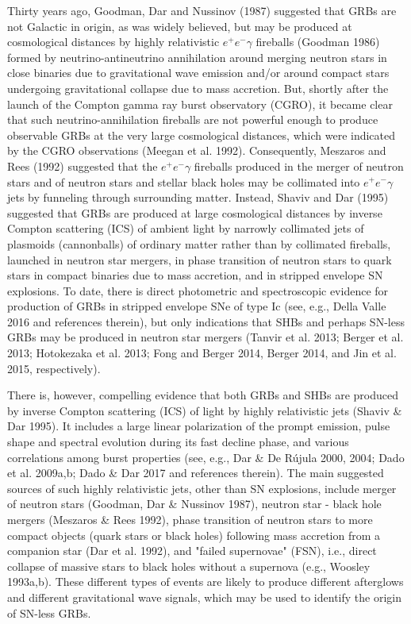 \documentclass[twocolumn]{aastex61}
\begin{document}
Thirty years ago, Goodman, Dar and Nussinov (1987) suggested that GRBs 
are not Galactic in origin, as was widely believed, but may be 
produced at cosmological distances by highly relativistic 
$e^+e^-\gamma$ fireballs (Goodman 1986) formed by 
neutrino-antineutrino annihilation around merging neutron stars in 
close binaries due to gravitational wave emission and/or around 
compact stars undergoing gravitational collapse due to mass accretion. 
But, shortly after the launch of the Compton gamma ray burst 
observatory (CGRO), it became clear that such neutrino-annihilation 
fireballs are not powerful enough to produce observable GRBs at the 
very large cosmological distances, which were indicated by the CGRO 
observations (Meegan et al. 1992). Consequently, Meszaros and Rees 
(1992) suggested that the $e^+e^-\gamma$ fireballs produced in the 
merger of neutron stars and of neutron stars and stellar black holes 
may be collimated into $e^+e^-\gamma$ jets by funneling through 
surrounding matter. Instead, Shaviv and Dar (1995) suggested that GRBs 
are produced at large cosmological distances by inverse Compton 
scattering (ICS) of ambient light by narrowly collimated jets of 
plasmoids (cannonballs) of ordinary matter rather than by collimated 
fireballs, launched in neutron star mergers, in phase transition of 
neutron stars to quark stars in compact binaries due to mass 
accretion, and in stripped envelope SN explosions. To date, there is 
direct photometric and spectroscopic evidence for production of GRBs 
in stripped envelope SNe of type Ic (see, e.g., Della Valle 2016 and 
references therein), but only indications that SHBs and perhaps 
SN-less GRBs may be produced in neutron star mergers (Tanvir et al. 
2013; Berger et al. 2013;  Hotokezaka et al. 2013; Fong and Berger 
2014, Berger 2014, and Jin et al. 2015, respectively).

There is, however, compelling evidence that both GRBs and SHBs are 
produced by inverse Compton scattering (ICS) of light by highly 
relativistic jets (Shaviv \& Dar 1995).  It includes a large linear 
polarization of the prompt emission, pulse shape and spectral 
evolution during its fast decline phase, and various correlations among 
burst properties (see, e.g., Dar \& De R\'ujula 2000, 2004; Dado et al. 2009a,b; 
Dado \& Dar 2017 and references therein). The main suggested sources of 
such highly relativistic jets, other than SN explosions, include merger of 
neutron stars (Goodman, Dar \& Nussinov 1987), neutron star - black hole 
mergers (Meszaros \& Rees 1992), phase transition of neutron stars to more 
compact objects (quark stars or black holes) following mass accretion 
from a companion star (Dar et al. 1992), and "failed supernovae" (FSN), 
i.e., direct collapse of massive stars to black holes without a supernova 
(e.g., Woosley 1993a,b). These different types of events are likely to 
produce different afterglows and different gravitational wave signals, 
which may be used to identify the origin of SN-less GRBs.
\end{document}
